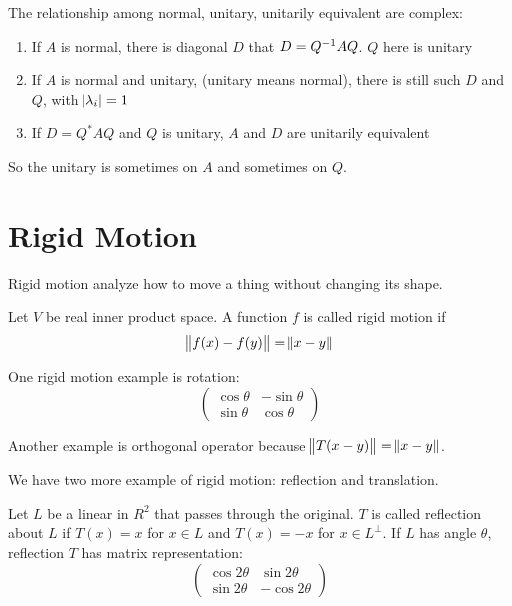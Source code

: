 The relationship among normal, unitary, unitarily equivalent are complex:
\begin{enumerate}
    \item If $A$ is normal, there is diagonal $D$ that $D = {Q}^{-1} A Q$. $Q$ here is unitary
    \item If $A$ is normal and unitary, (unitary means normal), there is still such $D$ and $Q$, with $\abs{\lambda_i} = 1$
    \item If $D = Q^* A Q$ and $Q$ is unitary, $A$ and $D$ are unitarily equivalent
\end{enumerate}

So the unitary is sometimes on $A$ and sometimes on $Q$.


\section{Rigid Motion}

Rigid motion analyze how to move a thing without changing its shape.

\begin{definition}
    Let $V$ be real inner product space. A function $f$ is called rigid motion if 
    \begin{equation}
        \norm{f(x) - f(y)} = \norm{x - y}
    \end{equation}
\end{definition}

One rigid motion example is rotation:
\begin{equation}
    \begin{pmatrix}
        \cos \theta & - \sin \theta \\
        \sin \theta & \cos \theta
    \end{pmatrix}
\end{equation}

Another example is orthogonal operator because $\norm{T(x-y)} = \norm{x - y}$.


We have two more example of rigid motion: reflection and translation.

\begin{definition}[Reflection]
    Let $L$ be a linear in $R^2$ that passes through the original. $T$ is called reflection about $L$ if $T(x) = x$ for $x \in L$ and $T(x) = -x$ for $x \in L^\perp$. If $L$ has angle $\theta$, reflection $T$ has matrix representation:
\begin{equation}
    \begin{pmatrix}
        \cos 2\theta & \sin 2\theta \\
        \sin 2\theta & -\cos 2\theta
    \end{pmatrix}
\end{equation}
\end{definition}

